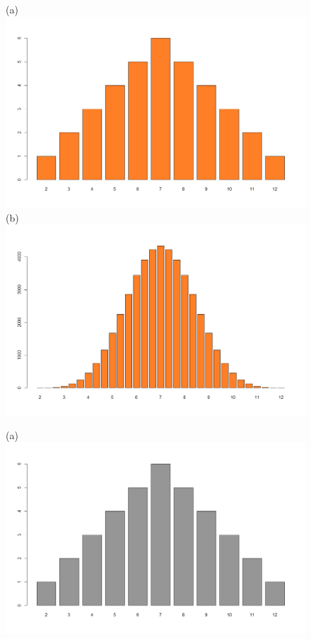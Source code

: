 \begin{ejemplo}
\begin{figure}[p]
\begin{center}
\begin{enColor}
(a)\\
\includegraphics[width=12cm]{../fig/cap06-DistribucionOriginalVsMuestral-01.png}\\
(b)\\
\includegraphics[width=12cm]{../fig/cap06-DistribucionOriginalVsMuestral-02.png}
\end{enColor}
\begin{bn}
(a)\\
\includegraphics[width=12cm]{../fig/cap06-DistribucionOriginalVsMuestral-01-bn.png}\\

\end{bn}
\end{center}
\end{figure}
\end{ejemplo}
